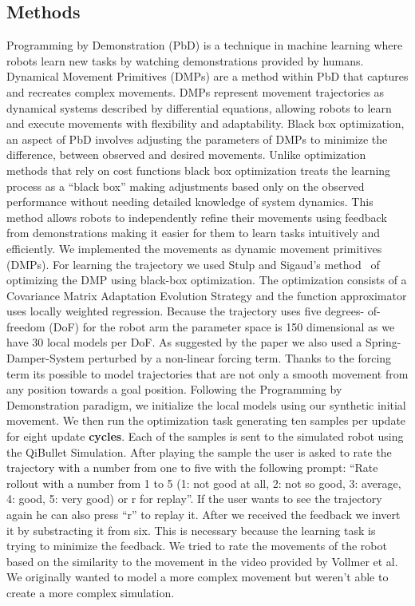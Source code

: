 \documentclass{article}
\begin{document}
    \subsection{Methods}
    Programming by Demonstration (PbD) is a technique in  machine learning where robots learn new tasks by watching
    demonstrations provided by humans.
    Dynamical Movement Primitives (DMPs) are a method within PbD that captures and recreates complex movements.
    DMPs represent movement trajectories as dynamical systems described by differential equations, allowing robots to learn
    and execute movements with flexibility and adaptability.
    Black box optimization, an aspect of PbD involves adjusting the parameters of DMPs to minimize the difference,
    between observed and desired movements.
    Unlike optimization methods that rely on cost functions black box optimization treats the learning process as a
    ``black box'' making adjustments based only on the observed performance without needing detailed knowledge of system
    dynamics.
    This method allows robots to independently refine their movements using feedback from demonstrations making it easier
    for them to learn tasks intuitively and efficiently.\newline
    We implemented the movements as dynamic movement primitives (DMPs).
    For learning the trajectory we used Stulp and Sigaud’s method~\cite{stulp2019dmpbbo} of optimizing the DMP using black-box optimization.
    The optimization consists of a Covariance Matrix Adaptation Evolution Strategy and the function approximator uses
    locally weighted regression.
    Because the trajectory uses five degrees- of-freedom (DoF) for the robot arm the parameter space is 150 dimensional
    as we have 30 local models per DoF\@.
    As suggested by the paper we also used a Spring-Damper-System perturbed by a non-linear forcing term.
    Thanks to the forcing term its possible to model trajectories that are not only a smooth movement from any position
    towards a goal position.
    Following the Programming by Demonstration paradigm, we initialize the local models using our synthetic initial movement.
    We then run the optimization task generating ten samples per update for eight update \textbf{cycles}.
    Each of the samples is sent to the simulated robot using the QiBullet Simulation.
    After playing the sample the user is asked to rate the trajectory with a number from one to five with the following prompt:
    ``Rate rollout with a number from 1 to 5 (1: not good at all, 2: not so good, 3: average, 4: good, 5: very good) or r for replay''.
    If the user wants to see the trajectory again he can also press ``r'' to replay it.
    After we received the feedback we invert it by substracting it from six.
    This is necessary because the learning task is trying to minimize the feedback.
    We tried to rate the movements of the robot based on the similarity to the movement in the video provided by Vollmer et al.
    We originally wanted to model a more complex movement but weren't able to create a more complex simulation.
\newpage
\end{document}
